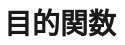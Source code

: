 \documentclass[../../topic_machine-learning]{subfiles}
\begin{document}
\chapter{目的関数}\label{chap:objective-function}


\end{document}
